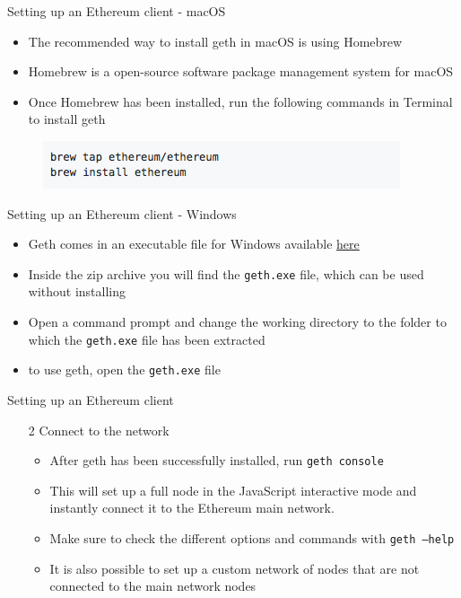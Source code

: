 \documentclass[10pt]{beamer}
\begin{document}

\begin{frame}{Setting up an Ethereum client - macOS}
	\begin{itemize}
		\item The recommended way to install geth in macOS is using Homebrew
		\item Homebrew is a open-source software package management system for macOS
		\item Once Homebrew has been installed, run the following commands in Terminal to install geth
	\end{itemize}
	\begin{figure}[]
		\centering
		\includegraphics  [scale=0.5]{Images/geth3}
	\end{figure}
\end{frame}


\begin{frame}{Setting up an Ethereum client - Windows}
	\begin{itemize}
		\item Geth comes in an executable file for Windows available \href{https://geth.ethereum.org/downloads/}{here}
		\item Inside the zip archive you will find the \texttt{geth.exe} file, which can be used without installing
		\item Open a command prompt and change the working directory to the folder to which the \texttt{geth.exe} file has been extracted
		\item to use geth, open the \texttt{geth.exe} file
	\end{itemize}
\end{frame}


\begin{frame}{Setting up an Ethereum client}
	\begin{enumerate}
		\item[2] Connect to the network
		\begin{itemize}
			\item After geth has been successfully installed, run \texttt{geth console}
			\item This will set up a full node in the JavaScript interactive mode and instantly connect it to the Ethereum main network.
			\item Make sure to check the different options and commands with \texttt{geth ---help}
			\item It is also possible to set up a custom network of nodes that are not connected to the main network nodes
		\end{itemize}
	\end{enumerate}
\end{frame}
\end{document}
